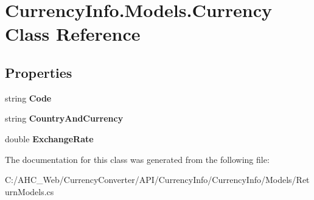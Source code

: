 \hypertarget{class_currency_info_1_1_models_1_1_currency}{\section{Currency\-Info.\-Models.\-Currency Class Reference}
\label{class_currency_info_1_1_models_1_1_currency}
}
\subsection*{Properties}
\begin{DoxyCompactItemize}
\item 
\hypertarget{class_currency_info_1_1_models_1_1_currency_a201ee9f7779e19a59e2a85953602d364}{string {\bfseries Code}}\label{class_currency_info_1_1_models_1_1_currency_a201ee9f7779e19a59e2a85953602d364}

\item 
\hypertarget{class_currency_info_1_1_models_1_1_currency_ab335dba4d1faec39a8f8ee0a2ce45200}{string {\bfseries Country\-And\-Currency}}\label{class_currency_info_1_1_models_1_1_currency_ab335dba4d1faec39a8f8ee0a2ce45200}

\item 
\hypertarget{class_currency_info_1_1_models_1_1_currency_a07fa8ae85b40c31fa7e2d13a99288224}{double {\bfseries Exchange\-Rate}}\label{class_currency_info_1_1_models_1_1_currency_a07fa8ae85b40c31fa7e2d13a99288224}

\end{DoxyCompactItemize}


The documentation for this class was generated from the following file\-:\begin{DoxyCompactItemize}
\item 
C\-:/\-A\-H\-C\-\_\-\-Web/\-Currency\-Converter/\-A\-P\-I/\-Currency\-Info/\-Currency\-Info/\-Models/Return\-Models.\-cs\end{DoxyCompactItemize}
